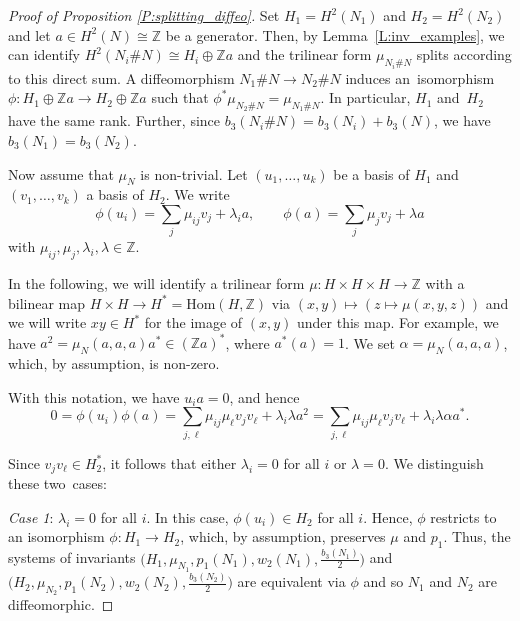 \documentclass[10pt,a4paper]{amsart}
\numberwithin{equation}{section}
\theoremstyle{definition}
\numberwithin{table}{section}
\newcommand{\Z}{\mathbb{Z}}
\begin{document}
\begin{proof}[Proof of Proposition \ref{P:splitting_diffeo}]
	Set $H_1=H^2(N_1)$ and $H_2=H^2(N_2)$ and let $a\in H^2(N)\cong\Z$ be a generator. Then, by Lemma~\ref{L:inv_examples}, we can identify $H^2(N_i\# N)\cong H_i\oplus \Z a$ and the trilinear form $\mu_{N_i\# N}$ splits according to this direct sum. A diffeomorphism $N_1\# N\to N_2\# N$ induces an~isomorphism $\phi\colon H_1\oplus \Z a\to H_2\oplus \Z a$ such that $\phi^*\mu_{N_2\# N}=\mu_{N_1\# N}$. In particular, $H_1$ and~$H_2$ have the same rank. Further, since $b_3(N_i\# N)=b_3(N_i)+b_3(N)$, we have $b_3(N_1)=b_3(N_2)$.
	
	Now assume that $\mu_N$ is non-trivial. Let $(u_1,\dots,u_k)$ be a basis of $H_1$ and $(v_1,\dots,v_k)$ a basis of $H_2$. We write
	\[ \phi(u_i)=\sum_j \mu_{ij} v_j+\lambda_i a,\qquad \phi(a)=\sum_j\mu_j v_j+\lambda a \]
	with $\mu_{ij},\mu_j,\lambda_i,\lambda\in\Z$.
	
	In the following, we will identify a trilinear form $\mu\colon H\times H\times H\to\Z$ with a bilinear map $H\times H\to H^*=\mathrm{Hom}(H,\Z)$ via $(x,y)\mapsto (z\mapsto\mu(x,y,z))$ and we will write $xy\in H^*$ for the image of $(x,y)$ under this map. For example, we have $a^2=\mu_N(a,a,a)a^*\in (\Z a)^*$, where $a^*(a)=1$. We set $\alpha=\mu_N(a,a,a)$, which, by assumption, is non-zero.
	
	With this notation, we have $u_i a=0$, and hence
	\[ 0=\phi(u_i)\phi(a)=\sum_{j,\ell}\mu_{ij}\mu_\ell v_j v_\ell +\lambda_i\lambda a^2=\sum_{j,\ell}\mu_{ij}\mu_\ell v_j v_\ell +\lambda_i\lambda\alpha a^*.  \]
	
	Since $v_j v_\ell\in H_2^*$, it follows that either $\lambda_i=0$ for all $i$ or $\lambda=0$. We distinguish these two~cases:

\emph{Case 1}: $\lambda_i=0$ for all $i$. In this case, $\phi(u_i)\in H_2$ for all $i$. Hence, $\phi$ restricts to an isomorphism $\phi\colon H_1\to H_2$, which, by assumption, preserves $\mu$ and $p_1$. Thus, the systems of invariants $\bigl(H_1,\mu_{N_1},p_1(N_1),w_2(N_1),\tfrac{b_3(N_1)}{2}\bigr)$ and $\bigl(H_2,\mu_{N_2},p_1(N_2),w_2(N_2),\tfrac{b_3(N_2)}{2}\bigr)$ are equivalent via $\phi$ and so $N_1$ and $N_2$ are diffeomorphic.


\end{proof}
\end{document}
